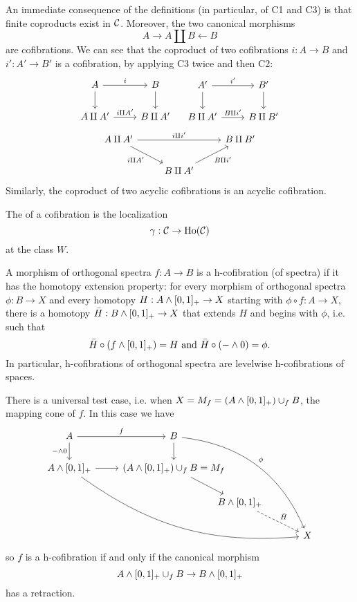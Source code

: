 An immediate consequence of the definitions (in particular, of C1 and C3) is that finite coproducts exist in $\mathcal{C}$. Moreover, the two canonical morphisms
\[A\to A\amalg B\leftarrow B\]
are cofibrations. We can see that the coproduct of two cofibrations $i:A\to B$ and $i':A'\to B'$ is a cofibration, by applying C3 twice and then C2:
\[
    \begin{tikzcd}
    A \ar[d] \ar[r,"i"] & B \ar[d]\\
    A\amalg A' \ar[r,"i\amalg A'"] & B\amalg A'
    \end{tikzcd}\quad
    \begin{tikzcd}
    A' \ar[d] \ar[r,"i'"] & B' \ar[d]\\
    B\amalg A' \ar[r,"B\amalg i'"] & B\amalg B'
    \end{tikzcd}
\]
\[
\begin{tikzcd}
A\amalg A' \ar[dr,"i\amalg A'"'] \ar[rr,"i\amalg i'"] & & B\amalg B'\\
 & B\amalg A' \ar[ur,"B\amalg i'"']
\end{tikzcd}
\]
Similarly, the coproduct of two acyclic cofibrations is an acyclic cofibration.

The  of a cofibration is the localization
\[\gamma:\mathcal{C}\to\operatorname{Ho}(\mathcal{C})\]
at the class $W$.

\begin{definition}
A morphism of orthogonal spectra $f:A\to B$ is a h-cofibration (of spectra) if it has the homotopy extension property: for every morphism of orthogonal spectra $\phi:B\to X$ and every homotopy $H:A\wedge[0,1]_+\to X$ starting with $\phi\circ f:A\to X$, there is a homotopy $\bar H:B\wedge[0,1]_+\to X$ that extends $H$ and begins with $\phi$, i.e. such that
\[\bar H\circ(f\smsh[0,1]_+)=H\text{ and }\bar H\circ(-\smsh0)=\phi.\]
In particular, h-cofibrations of orthogonal spectra are levelwise h-cofibrations of spaces.
\end{definition}

There is a universal test case, i.e. when $X=M_f=(A\wedge[0,1]_+)\cup_f B$, the mapping cone of $f$. In this case we have
\[
\begin{tikzcd}
A \arrow[r, "f"] \arrow[d, "- \smsh 0", swap] & B \arrow[d] \arrow[rrddd, "\phi", bend left]\\
{A \smsh [0,1]_+} \arrow[rrrdd, bend right=20] \arrow[r] & {(A \smsh [0,1]_+) \cup_f B = M_f} \arrow[dr]\\
 & &[-4em] {B \smsh [0,1]_+} \arrow[dr, dashed, "\bar H"]\\
 & & &[+1em] X
\end{tikzcd}
\]
so $f$ is a h-cofibration if and only if the canonical morphism
\[A\wedge[0,1]_+\cup_f B\to B\wedge[0,1]_+\]
has a retraction.

